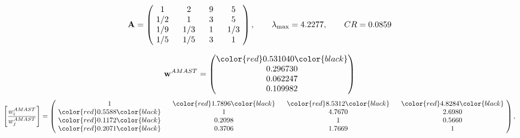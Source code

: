 \begin{example}
\begin{equation*}
\mathbf{A} =
\begin{pmatrix}
$\,\,$ 1 $\,\,$ & $\,\,$2$\,\,$ & $\,\,$9$\,\,$ & $\,\,$5 $\,\,$ \\
$\,\,$ 1/2$\,\,$ & $\,\,$ 1 $\,\,$ & $\,\,$3$\,\,$ & $\,\,$5 $\,\,$ \\
$\,\,$ 1/9$\,\,$ & $\,\,$ 1/3$\,\,$ & $\,\,$ 1 $\,\,$ & $\,\,$ 1/3 $\,\,$ \\
$\,\,$ 1/5$\,\,$ & $\,\,$ 1/5$\,\,$ & $\,\,$3$\,\,$ & $\,\,$ 1  $\,\,$ \\
\end{pmatrix},
\qquad
\lambda_{\max} =
4.2277,
\qquad
CR = 0.0859
\end{equation*}

\begin{equation*}
\mathbf{w}^{AMAST} =
\begin{pmatrix}
\color{red} 0.531040\color{black} \\
0.296730\\
0.062247\\
0.109982
\end{pmatrix}\end{equation*}
\begin{equation*}
\left[ \frac{{w}^{AMAST}_i}{{w}^{AMAST}_j} \right] =
\begin{pmatrix}
$\,\,$ 1 $\,\,$ & $\,\,$\color{red} 1.7896\color{black} $\,\,$ & $\,\,$\color{red} 8.5312\color{black} $\,\,$ & $\,\,$\color{red} 4.8284\color{black} $\,\,$ \\
$\,\,$\color{red} 0.5588\color{black} $\,\,$ & $\,\,$ 1 $\,\,$ & $\,\,$4.7670$\,\,$ & $\,\,$2.6980  $\,\,$ \\
$\,\,$\color{red} 0.1172\color{black} $\,\,$ & $\,\,$0.2098$\,\,$ & $\,\,$ 1 $\,\,$ & $\,\,$0.5660 $\,\,$ \\
$\,\,$\color{red} 0.2071\color{black} $\,\,$ & $\,\,$0.3706$\,\,$ & $\,\,$1.7669$\,\,$ & $\,\,$ 1  $\,\,$ \\
\end{pmatrix},
\end{equation*}


\end{example}
